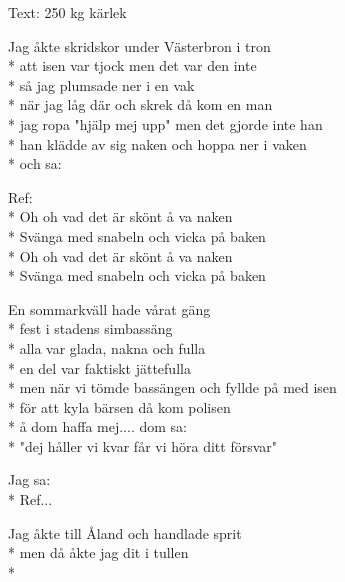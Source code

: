 \begin{SongText}[Naken]
    \begin{SongInfo}
        Text: 250 kg kärlek
    \end{SongInfo}
    \begin{SongVerse}
        Jag åkte skridskor under Västerbron i tron \\*%
        att isen var tjock men det var den inte\\*%
        så jag plumsade ner i en vak\\*%
        när jag låg där och skrek då kom en man\\*%
        jag ropa "hjälp mej upp" men det gjorde inte han\\*%
        han klädde av sig naken och hoppa ner i vaken \\*%
        och sa:
    \end{SongVerse}
    \begin{SongVerse}
        Ref:\\*%
        Oh oh vad det är skönt å va naken\\*%
        Svänga med snabeln och vicka på baken\\*%
        Oh oh vad det är skönt å va naken\\*%
        Svänga med snabeln och vicka på baken
    \end{SongVerse}
    \begin{SongVerse}
        En sommarkväll hade vårat gäng \\*%
        fest i stadens simbassäng \\*%
        alla var glada, nakna och fulla\\*%
        en del var faktiskt jättefulla\\*%
        men när vi tömde bassängen och fyllde på med isen \\*%
        för att kyla bärsen då kom polisen\\*%
        å dom haffa mej.... dom sa:\\*%
        "dej håller vi kvar får vi höra ditt försvar"
    \end{SongVerse}
    \begin{SongVerse}
        Jag sa:\\*%
        Ref...
    \end{SongVerse}
    \begin{SongVerse}
        Jag åkte till Åland och handlade sprit \\*%
        men då åkte jag dit i tullen\\*%

\end{SongVerse}
\end{SongText}
